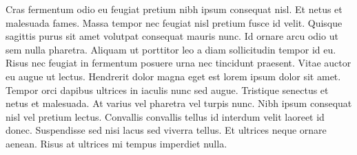\documentclass[a4paper,12pt,oneside]{article}
\begin{document}
Cras fermentum odio eu feugiat pretium nibh ipsum consequat nisl. Et netus et malesuada fames. Massa tempor nec feugiat nisl pretium fusce id velit. Quisque sagittis purus sit amet volutpat consequat mauris nunc. Id ornare arcu odio ut sem nulla pharetra. Aliquam ut porttitor leo a diam sollicitudin tempor id eu. Risus nec feugiat in fermentum posuere urna nec tincidunt praesent. Vitae auctor eu augue ut lectus. Hendrerit dolor magna eget est lorem ipsum dolor sit amet. Tempor orci dapibus ultrices in iaculis nunc sed augue. Tristique senectus et netus et malesuada. At varius vel pharetra vel turpis nunc. Nibh ipsum consequat nisl vel pretium lectus. Convallis convallis tellus id interdum velit laoreet id donec. Suspendisse sed nisi lacus sed viverra tellus. Et ultrices neque ornare aenean. Risus at ultrices mi tempus imperdiet nulla.
\end{document}
